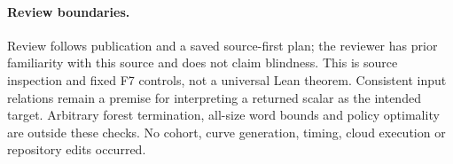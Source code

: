 \documentclass[11pt]{article}
\begin{document}
\paragraph{Review boundaries.} Review follows publication and a saved source-first plan; the reviewer has prior familiarity with this source and does not claim blindness. This is source inspection and fixed F7 controls, not a universal Lean theorem. Consistent input relations remain a premise for interpreting a returned scalar as the intended target. Arbitrary forest termination, all-size word bounds and policy optimality are outside these checks. No cohort, curve generation, timing, cloud execution or repository edits occurred.
\end{document}
